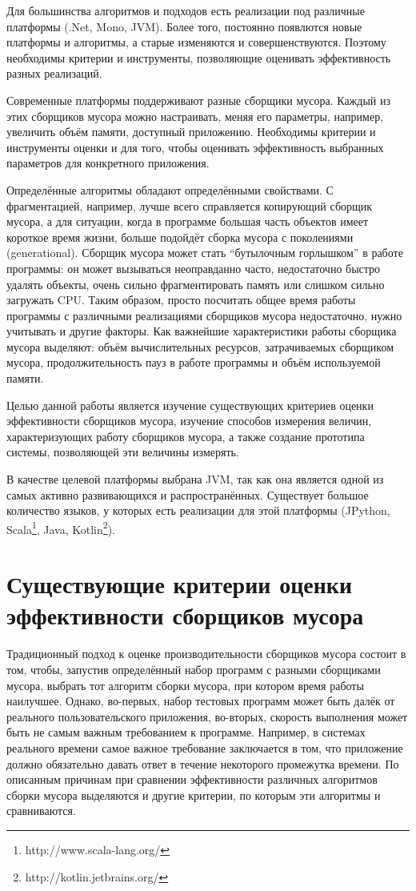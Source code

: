 Для большинства алгоритмов и подходов есть реализации под различные платформы (.Net,
Mono, JVM). Более того, постоянно появлются новые платформы и алгоритмы, а старые 
изменяются и совершенствуются. Поэтому необходимы критерии
и инструменты, позволяющие оценивать эффективность разных реализаций.

Современные платформы поддерживают разные
сборщики мусора. Каждый из этих сборщиков мусора можно настраивать, меняя его параметры,
например, увеличить объём памяти, доступный приложению. 
Необходимы критерии и инструменты оценки и для того, чтобы оценивать
эффективность выбранных параметров для конкретного приложения. 

Определённые алгоритмы обладают определёнными свойствами. С фрагментацией, например, лучше всего 
справляется копирующий сборщик мусора, а для ситуации, когда в программе большая
часть объектов имеет короткое время жизни, больше подойдёт сборка мусора с поколениями (generational).
Сборщик мусора может стать ``бутылочным горлышком'' в работе программы: он может вызываться
неоправданно часто, недостаточно быстро удалять объекты, очень сильно фрагментировать 
память или слишком сильно загружать CPU. Таким образом, просто посчитать общее время 
работы программы с различными реализациями сборщиков мусора недостаточно, нужно 
учитывать и другие факторы. Как важнейшие характеристики работы сборщика мусора выделяют:
объём вычислительных ресурсов, затрачиваемых сборщиком мусора, продолжительность
пауз в работе программы и объём используемой памяти.

Целью данной работы является изучение существующих критериев оценки эффективности сборщиков 
мусора, изучение способов измерения величин, характеризующих работу сборщиков мусора,
а также создание прототипа системы, позволяющей эти величины измерять. 

В качестве целевой платформы выбрана JVM, так как она является одной из самых активно 
развивающихся и распространённых. Существует большое количество языков, у которых 
есть реализации для этой платформы (JPython, Scala\footnote{http://www.scala-lang.org/},
Java, Kotlin\footnote{http://kotlin.jetbrains.org/}).

\section{Существующие критерии оценки эффективности сборщиков мусора}

Традиционный подход к оценке производительности сборщиков мусора состоит в том, чтобы,
запустив определённый набор программ с разными сборщиками мусора, выбрать тот 
алгоритм сборки мусора, при котором время работы наилучшее. Однако, во-первых, набор
тестовых программ может быть далёк от реального пользовательского приложения, во-вторых,
скорость выполнения может быть не самым важным требованием к программе. Например, в системах
реального времени самое важное требование заключается в том, что приложение должно
обязательно давать ответ в течение некоторого промежутка времени. По описанным причинам
при сравнении эффективности различных алгоритмов сборки мусора выделяются и другие критерии,
по которым эти алгоритмы и сравниваются. 

